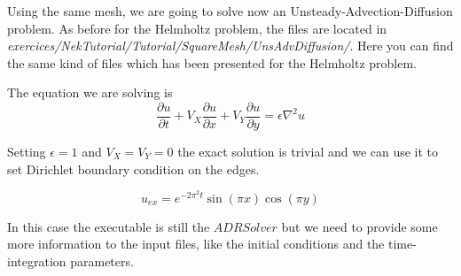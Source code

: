 \documentclass[12pt]{article}
\begin{document}
Using the same mesh, we are going to solve now an Unsteady-Advection-Diffusion problem. As before for the Helmholtz problem, the files are located in
\emph{exercices/NekTutorial/Tutorial/SquareMesh/UnsAdvDiffusion/}. Here you can find the same kind of files which has been presented for the Helmholtz problem.

The equation we are solving is
\begin{equation}
\frac{\partial u}{\partial t} + V_X \frac{\partial u}{\partial x} + V_Y \frac{\partial u}{\partial y} = \epsilon \nabla^2 u
\end{equation}

\noindent
Setting $\epsilon = 1$ and $V_X=V_Y=0$ the exact solution is trivial and we can use it to set Dirichlet boundary condition on the edges.

\begin{equation}
u_{ex}= e^{-2\pi^2 t}\sin(\pi x)\cos(\pi y)
\end{equation}

\noindent
In this case the executable is still the $ADRSolver$ but we need to provide some more information to the input files, like the initial conditions and the time-integration parameters.
\end{document}
